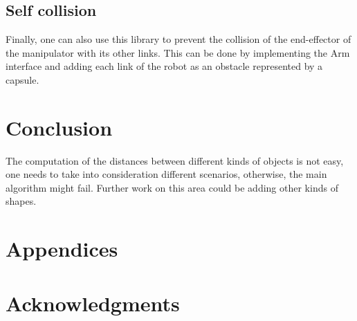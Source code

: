 \documentclass[a4paper, 10pt, conference]{ieeeconf}      %
\begin{document}
\subsection{Self collision} %
Finally, one can also use this library to prevent the collision of the end-effector of the manipulator with its other links.
This can be done by implementing the Arm interface and adding each link of the robot as an obstacle represented by a capsule.

\section{Conclusion} %
The computation of the distances between different kinds of objects is not easy, one needs to take into consideration different scenarios, 
otherwise, the main algorithm might fail. Further work on this area could be adding other kinds of shapes.


\addtolength{\textheight}{-12cm}   %







\section*{Appendices}

\section*{Acknowledgments}


\end{document}
